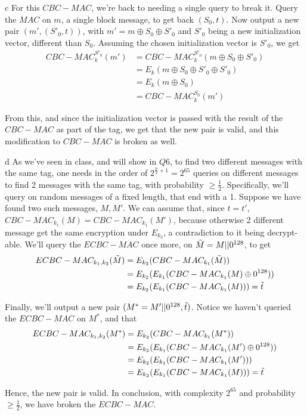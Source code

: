 \documentclass{article}
\begin{document}
\begin{paragraph}
    c For this $CBC-MAC$, we're back to needing a single query to break it. Query the $MAC$ on $m$, a single block message, to get back $(S_0, t)$. Now output a new pair $(m', (S'_0, t))$, with $m' = m \oplus S_0 \oplus S'_0$ and $S'_0$ being a new initialization vector, different than $S_0$. Assuming the chosen initialization vector is $S'_0$, we get
    \begin{align*}
        CBC-MAC_k^{S'_0}(m') &= CBC-MAC_k^{S'_0}(m \oplus S_0 \oplus S'_0)\\
        &= E_k(m \oplus S_0 \oplus S'_0 \oplus S'_0)\\
        &= E_k(m \oplus S_0)\\
        &= CBC-MAC_k^{S_0}(m')
    \end{align*}
    
    From this, and since the initialization vector is passed with the result of the $CBC-MAC$ as part of the tag, we get that the new pair is valid, and this modification to $CBC-MAC$ is broken as well.
\end{paragraph}

\begin{paragraph}
    d As we've seen in class, and will show in $Q6$, to find two different messages with the same tag, one needs in the order of $2^{\frac{n}{2} + 1} = 2^{65}$ queries on different messages to find 2 messages with the same tag, with probability $\geq \frac{1}{2}$. Specifically, we'll query on random messages of a fixed length, that end with a 1. Suppose we have found two such messages, $M, M'$. We can assume that, since $t = t'$, $CBC-MAC_{k_1}(M) = CBC-MAC_{k_1}(M')$, because otherwise 2 different message get the same encryption under $E_{k_2}$, a contradiction to it being decrypt-able. We'll query the $ECBC-MAC$ once more, on $\Tilde{M} = M || 0^{128}$, to get
    \begin{align*}
        ECBC-MAC_{k_1, k_2}(\Tilde{M}) &= E_{k_2}(CBC-MAC_{k_1}(\Tilde{M}))\\
        &= E_{k_2}(E_{k_1}(CBC-MAC_{k_1}(M) \oplus 0^{128}))\\
        &= E_{k_2}(E_{k_1}(CBC-MAC_{k_1}(M))) = \Tilde{t}
    \end{align*}
    
    Finally, we'll output a new pair $(M^* = M' || 0^{128}, \Tilde{t})$. Notice we haven't queried the $ECBC-MAC$ on $M^*$, and that
    \begin{align*}
        ECBC-MAC_{k_1, k_2}(M^*) &= E_{k_2}(CBC-MAC_{k_1}(M^*))\\
        &= E_{k_2}(E_{k_1}(CBC-MAC_{k_1}(M') \oplus 0^{128}))\\
        &= E_{k_2}(E_{k_1}(CBC-MAC_{k_1}(M')))\\
        &= E_{k_2}(E_{k_1}(CBC-MAC_{k_1}(M))) = \Tilde{t}
    \end{align*}
    
    Hence, the new pair is valid. In conclusion, with complexity $2^{65}$ and probability $\geq \frac{1}{2}$, we have broken the $ECBC-MAC$.
\end{paragraph}
\end{document}
